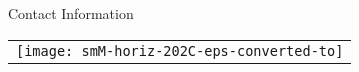 \documentclass[final]{beamer}
\newlength{\onecolwid}
\begin{document}
\begin{frame}[t]
\begin{columns}[t]
\begin{column}{\onecolwid}
\begin{alertblock}{Contact Information}
\end{alertblock}

\begin{center}
\begin{tabular}{c}
\texttt{[image: smM-horiz-202C-eps-converted-to]}%
\end{tabular}
\end{center}


\end{column} %

\end{columns} %

\end{frame} %
\end{document}
